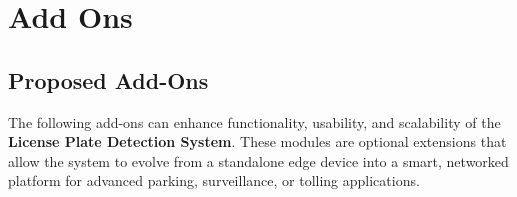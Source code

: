 %
%

\chapter{Add Ons}

\section{Proposed Add-Ons}

The following add-ons can enhance functionality, usability, and scalability of the \textbf{License Plate Detection System}.  
These modules are optional extensions that allow the system to evolve from a standalone edge device into a smart, networked platform for advanced parking, surveillance, or tolling applications.

